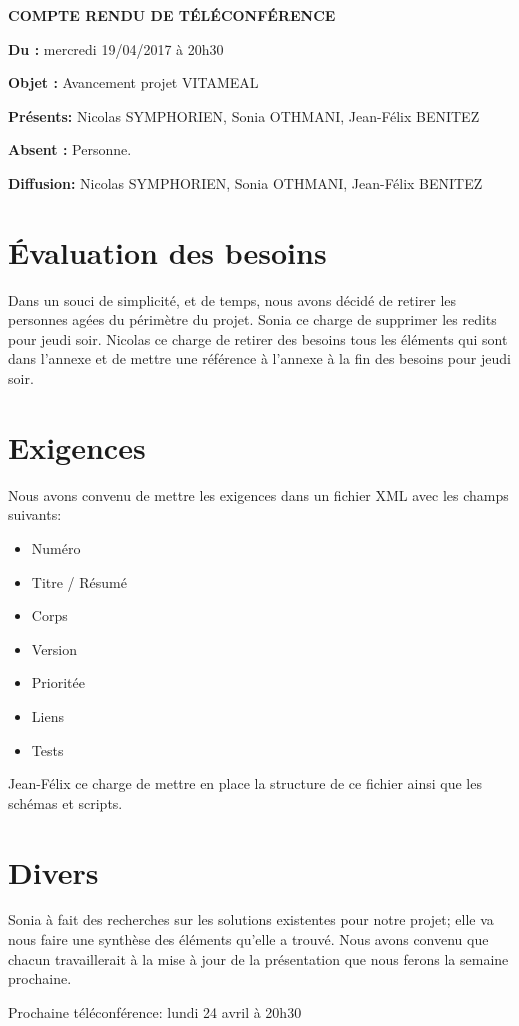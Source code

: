 \documentclass[11pt,a4paper,french,twoside,openright]{article}
\begin{document}
\pagestyle{fancy}

\begin{center}\bfseries\Huge
COMPTE RENDU DE TÉLÉCONFÉRENCE
\end{center}

\textbf{Du      :} mercredi 19/04/2017 à 20h30

\textbf{Objet   :} Avancement projet VITAMEAL

\textbf{Présents:} Nicolas SYMPHORIEN, Sonia OTHMANI, Jean-Félix BENITEZ

\textbf{Absent :} Personne.

\textbf{Diffusion:} Nicolas SYMPHORIEN, Sonia OTHMANI, Jean-Félix BENITEZ

\hrulefill

\section{Évaluation des besoins}
Dans un souci de simplicité, et de temps, nous avons décidé de retirer les personnes agées du périmètre du projet.
Sonia ce charge de supprimer les redits pour jeudi soir.
Nicolas ce charge de retirer des besoins tous les éléments qui sont dans l'annexe et de mettre une référence à l'annexe à la fin des besoins pour jeudi soir.

\section{Exigences}
Nous avons convenu de mettre les exigences dans un fichier XML avec les champs suivants:
\begin{itemize}
\item Numéro
\item Titre / Résumé
\item Corps
\item Version
\item Prioritée
\item Liens
\item Tests
\end{itemize}
Jean-Félix ce charge de mettre en place la structure de ce fichier ainsi que les schémas et scripts.

\section{Divers}
Sonia à fait des recherches sur les solutions existentes pour notre projet; elle va nous faire une synthèse des éléments qu'elle a trouvé.
Nous avons convenu que chacun travaillerait à la mise à jour de la présentation que nous ferons la semaine prochaine.

Prochaine téléconférence: lundi 24 avril à 20h30

\label{LastPage}
\end{document}
